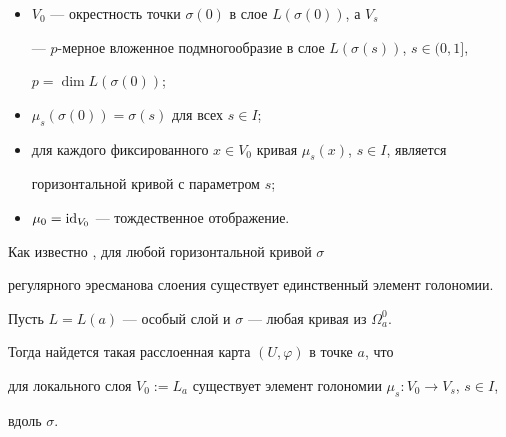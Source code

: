 \begin{itemize}


\item[(1)] $V_0$ --- окрестность точки $\sigma(0)$ в слое $L(\sigma(0))$, а $V_s$


--- $p$-мерное вложенное подмногообразие в слое $L(\sigma(s))$, $s\in (0,1]$,


$p=\dim L(\sigma(0))$;


\item[(2)] $\mu_s(\sigma(0))=\sigma(s)$ для всех $s\in I$;


\item[(3)] для каждого фиксированного $x\in V_0$ кривая $\mu_s(x)$, $s\in I$, является


горизонтальной кривой с параметром $s$;


\item[(4)] $\mu_0=\operatorname{id}_{V_0}$ --- тождественное отображение.


\end{itemize}





Как известно \cite{BH}, для любой горизонтальной кривой $\sigma$


регулярного эресманова слоения существует единственный элемент голономии.





\begin{lem}\label{3}


Пусть $L=L(a)$ --- особый слой и $\sigma$ --- любая кривая из $\Omega^0_a$.


Тогда найдется такая расслоенная карта $(U,\varphi)$ в точке $a$, что


для локального слоя $V_0:=L_a$ существует элемент голономии $\mu_s: V_0\to V_s$, $s\in I$,


вдоль $\sigma$.


\end{lem}





